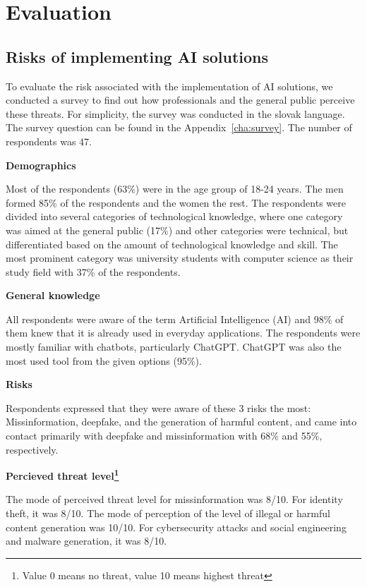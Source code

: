 \chapter{Evaluation \label{cha:eva}}


\section{Risks of implementing AI solutions \label{sec:eval_risks_survey}}
To evaluate the risk associated with the implementation of AI solutions, we conducted a survey to find out how professionals and the general public perceive these threats. For simplicity, the survey was conducted in the slovak language. The survey question can be found in the Appendix~\ref{cha:survey}. The number of respondents was 47.

\textbf{Demographics}

Most of the respondents (63\%) were in the age group of 18-24 years. The men formed 85\% of the respondents and the women the rest. The respondents were divided into several categories of technological knowledge, where one category was aimed at the general public (17\%) and other categories were technical, but differentiated based on the amount of technological knowledge and skill. The most prominent category was university students with computer science as their study field with 37\% of the respondents.

\textbf{General knowledge}

All respondents were aware of the term Artificial Intelligence (AI) and 98\% of them knew that it is already used in everyday applications. The respondents were mostly familiar with chatbots, particularly ChatGPT. ChatGPT was also the most used tool from the given options (95\%).

\textbf{Risks}

Respondents expressed that they were aware of these 3 risks the most: Missinformation, deepfake, and the generation of harmful content, and came into contact primarily with deepfake and missinformation with 68\% and 55\%, respectively.

\textbf{Percieved threat level\footnote{Value 0 means no threat, value 10 means highest threat}}

The mode of perceived threat level for missinformation was 8/10.
For identity theft, it was 8/10.
The mode of perception of the level of illegal or harmful content generation was 10/10.
For cybersecurity attacks and social engineering and malware generation, it was 8/10.


